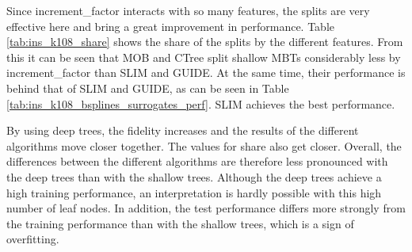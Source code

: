 Since increment\_factor interacts with so many features, the splits are very effective here and bring a great improvement in performance. Table \ref{tab:ins_k108_share} shows the share of the splits by the different features. From this it can be seen that MOB and CTree split shallow MBTs considerably less by increment\_factor than SLIM and GUIDE. At the same time, their performance is behind that of SLIM and GUIDE, as can be seen in Table \ref{tab:ins_k108_bsplines_surrogates_perf}. SLIM achieves the best performance.





By using deep trees, the fidelity increases and the results of the different algorithms move closer together. The values for share also get closer. Overall, the differences between the different algorithms are therefore less pronounced with the deep trees than with the shallow trees. Although the deep trees achieve a high training performance, an interpretation is hardly possible with this high number of leaf nodes. In addition, the test performance differs more strongly from the training performance than with the shallow trees, which is a sign of overfitting.




